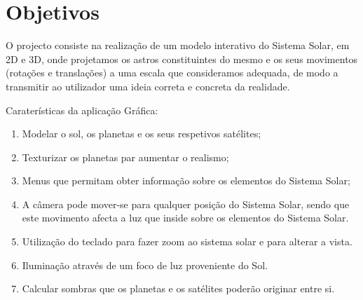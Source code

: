 \section{Objetivos}
\label{sec:obj}

O projecto consiste na realização de um modelo interativo do Sistema Solar, em 2D e 3D, onde  projetamos os astros constituintes do mesmo e os seus movimentos (rotações e translações) a uma escala que consideramos adequada, de modo a transmitir ao utilizador uma ideia correta e concreta da realidade.

Caraterísticas da aplicação Gráfica:
\begin{enumerate}
    \item Modelar o sol, os planetas e os seus respetivos satélites;
    \item Texturizar os planetas par aumentar o realismo;
    \item Menus que permitam obter informação sobre os elementos do Sistema Solar;
    \item A câmera pode mover-se para qualquer posição do Sistema Solar, sendo que este movimento afecta a luz que inside sobre os elementos do Sistema Solar.
    \item Utilização do teclado para fazer zoom ao sistema solar e para alterar a vista.
    \item Iluminação através de um foco de luz proveniente do Sol.
    \item Calcular sombras que os planetas e os satélites poderão originar entre si.
\end{enumerate}    

